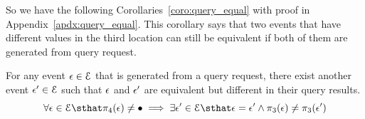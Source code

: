 {{So we have the following Corollaries~\ref{coro:query_equal} with proof in Appendix~\ref{apdx:query_equal}.
This corollary says that two events that have different values 
in the third location can still be equivalent if both of them are generated from query request.
\begin{coro}
 \label{coro:query_equal}
 For any event $\mathtt{\epsilon} \in \mathcal{E}$ that is generated from a query request, 
 there exist another event $\mathtt{\epsilon}' \in \mathcal{E}$ 
 such that 
 $\mathtt{\epsilon}$ and $\mathtt{\epsilon}'$ are equivalent but different in their query results.
 \[
 \forall \event \in \eventset \sthat 
 \pi_4(\event) \neq \bullet
 \implies \exists 
 \event' \in \eventset \sthat 
 \event = \event' \land \pi_3(\event) \neq \pi_3(\event')
 \]
 \end{coro}

 


}}
